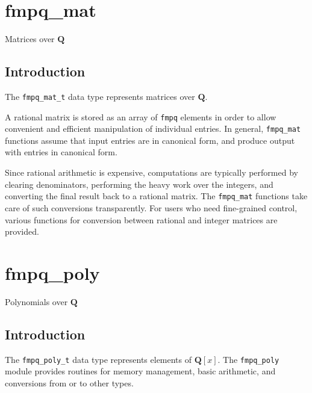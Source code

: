 \documentclass[a4paper,10pt]{book}
\newcommand{\Q}{\mathbf{Q}}%
\newcommand{\code}{\lstinline}
\begin{document}



\chapter{fmpq\_mat}
\epigraph{Matrices over $\Q$}{}

\section{Introduction}

The \code{fmpq_mat_t} data type represents matrices over $\Q$.

A rational matrix is stored as an array of \code{fmpq} elements in order
to allow convenient and efficient manipulation of individual entries.
In general, \code{fmpq_mat} functions assume that input entries are
in canonical form, and produce output with entries in canonical form.

Since rational arithmetic is expensive, computations are typically performed
by clearing denominators, performing the heavy work over the integers,
and converting the final result back to a rational matrix. The
\code{fmpq_mat} functions take care of such conversions transparently.
For users who need fine-grained control, various
functions for conversion between rational and integer matrices are provided.




\chapter{fmpq\_poly}
\epigraph{Polynomials over $\Q$}{}

\section{Introduction}

The \code{fmpq_poly_t} data type represents elements of $\Q[x]$. The 
\code{fmpq_poly} module provides routines for memory management, basic 
arithmetic, and conversions from or to other types.
\end{document}
